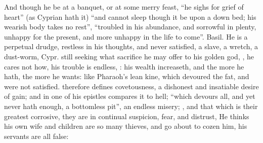 And though he be at a banquet, or at some merry feast, \enquote{he sighs for grief of
heart} (as Cyprian hath it) \enquote{and cannot sleep though it be
upon a down bed; his wearish body takes no rest},
\enquote{troubled in his abundance, and sorrowful in plenty,
unhappy for the present, and more unhappy in the life to come}. Basil. He is a
perpetual drudge, restless in his thoughts, and never
satisfied, a slave, a wretch, a dust-worm,  Cypr.  still seeking
what sacrifice he may offer to his golden god, , he cares
not how, his trouble is endless, : his wealth increaseth, and the more
he hath, the more he wants: like Pharaoh's lean kine,
which devoured the fat, and were not satisfied. \Austin{}
therefore defines covetousness,  a dishonest and insatiable desire of gain; and in one
of his epistles compares it to hell; \enquote{which devours all,
and yet never hath enough, a bottomless pit}, an endless misery; , and that which is
their greatest corrosive, they are in continual suspicion, fear, and distrust,
He thinks his own wife and children are so many thieves, and go about to cozen
him, his servants are all false:


